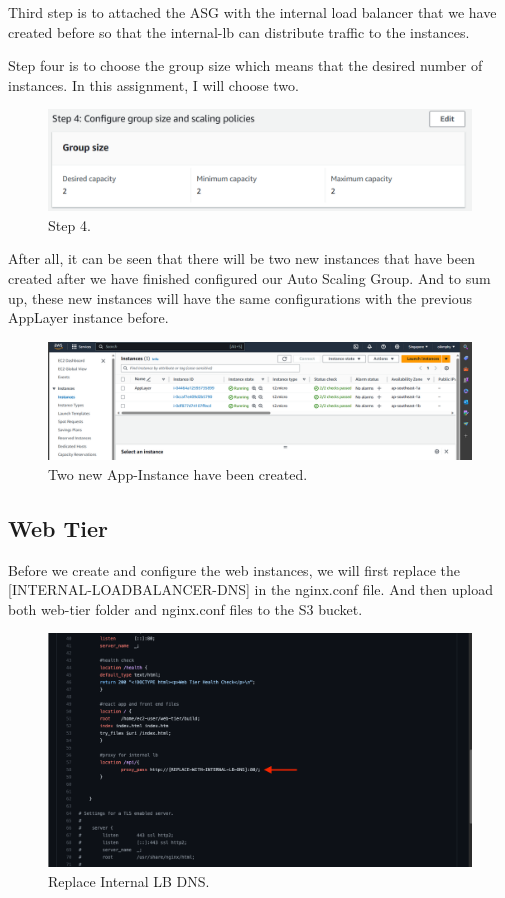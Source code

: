 \documentclass{article}
\begin{document}
Third step is to attached the ASG with the internal load balancer that we have created before so that the internal-lb can distribute traffic to the instances.\par
\newpage

Step four is to choose the group size which means that the desired number of instances. In this assignment, I will choose two.
\begin{figure}[h]
    \centering
    \includegraphics[width=12cm]{Pictures/Internal LB/ASG_4.png}
    \caption{Step 4.}
    \label{fig:enter-label}
\end{figure}

After all, it can be seen that there will be two new instances that have been created after we have finished configured our Auto Scaling Group. And to sum up, these new instances will have the same configurations with the previous AppLayer instance before.\par
\begin{figure}[h]
    \centering
    \includegraphics[width=12cm]{Pictures/Internal LB/ASG_5.png}
    \caption{Two new App-Instance have been created.}
    \label{fig:enter-label}
\end{figure}

\newpage

\subsection{Web Tier}
Before we create and configure the web instances, we will first replace the [INTERNAL-LOADBALANCER-DNS] in the nginx.conf file. And then upload both web-tier folder and nginx.conf files to the S3 bucket.\par
\begin{figure}[h]
    \centering
    \includegraphics[width=12cm]{Pictures/Web-tier/nginx conf.png}
    \caption{Replace Internal LB DNS.}
    \label{fig:enter-label}
\end{figure}
\end{document}
